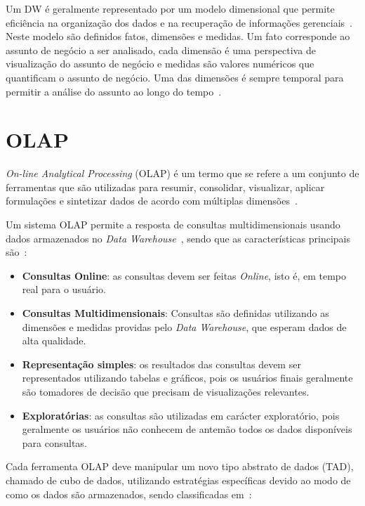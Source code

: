 Um DW é geralmente representado por um modelo dimensional que permite eficiência na organização dos dados e na recuperação de informações gerenciais~\cite{kimballDataWarehouseToolkit2013}.
Neste modelo são definidos fatos, dimensões e medidas.
Um fato corresponde ao assunto de negócio a ser analisado, cada dimensão é uma perspectiva de visualização do assunto de negócio e medidas são valores numéricos que quantificam o assunto de negócio.
Uma das dimensões é sempre temporal para permitir a análise do assunto ao longo do tempo~\cite{silva:2015:abordagensParaCubo}.

\section{OLAP}
\label{ch:fun:olap}

\textit{On-line Analytical Processing} (OLAP) é um termo que se refere a um conjunto de ferramentas que são utilizadas para resumir, consolidar, visualizar, aplicar formulações e sintetizar dados de acordo com múltiplas dimensões~\cite{coddProvidingOlapUseranalysts1998}.

Um sistema OLAP permite a resposta de consultas multidimensionais usando dados armazenados no \textit{Data Warehouse}~\cite{kimballDataWarehouseToolkit2013}, sendo que as características principais são~\cite{bimonteOpenIssuesBig2016}:

\begin{itemize}
	\item \textbf{Consultas Online}: as consultas devem ser feitas \textit{Online}, isto é, em tempo real para o usuário.
	\item \textbf{Consultas Multidimensionais}: Consultas são definidas utilizando as dimensões e medidas providas pelo \textit{Data Warehouse}, que esperam dados de alta qualidade.
	\item \textbf{Representação simples}: os resultados das consultas devem ser representados utilizando tabelas e gráficos, pois os usuários finais geralmente são tomadores de decisão que precisam de visualizações relevantes.
	\item \textbf{Exploratórias}: as consultas são utilizadas em carácter exploratório, pois geralmente os usuários não conhecem de antemão todos os dados disponíveis para consultas.
\end{itemize}

Cada ferramenta OLAP deve manipular um novo tipo abstrato de dados (TAD), chamado de cubo de dados, utilizando estratégias específicas devido ao modo de como os dados são armazenados, sendo classificadas em~\cite{moreiraFullPartialData2012}:

